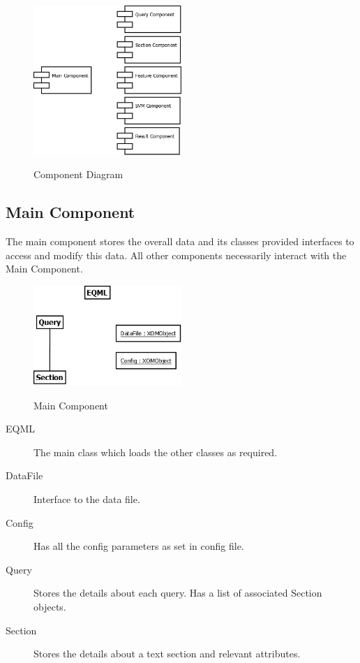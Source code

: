\documentclass[10pt,a4paper]{report}
\begin{document}
\begin{figure}[h!]
\centering
\includegraphics[width=0.50\textwidth]{./diagrams/Component}\\
\caption{Component Diagram}
\end{figure}

\clearpage


\subsection{Main Component}

The main component stores the overall data and its classes provided interfaces to access and modify this data. All other components necessarily interact with the Main Component. \\

\begin{figure}[h!]
\centering
\includegraphics[width=0.50\textwidth]{./diagrams/Main}\\
\caption{Main Component}
\end{figure}

\begin{description}
	\item[EQML] The main class which loads the other classes as required.
	\item[DataFile] Interface to the data file.
	\item[Config] Has all the config parameters as set in config file.
	\item[Query] Stores the details about each query. Has a list of associated Section objects.
	\item[Section] Stores the details about a text section and relevant attributes.
\end{description}
\end{document}
